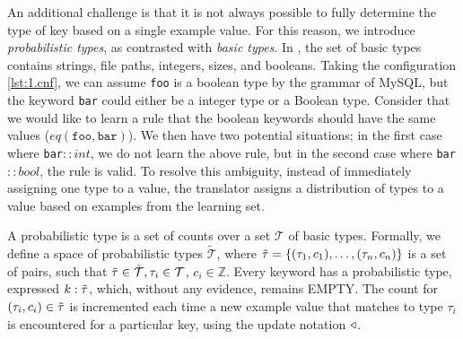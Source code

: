 An additional challenge is that it is not always possible to fully determine the type of key based on a single example value. 
For this reason, we introduce \textit{probabilistic types}, as contrasted with \textit{basic types}.
In \app, the set of basic types contains strings, file paths, integers, sizes, and booleans. 
Taking the configuration \ref{lst:1.cnf}, we can assume {\tt foo} is a boolean type by the grammar of MySQL,
  but the keyword {\tt bar} could either be a integer type or a Boolean type.
Consider that we would like to learn a rule that the boolean keywords should have the same values ($eq(\texttt{foo},\texttt{bar})$).
We then have two potential situations; in the first case where {\tt bar}$::int$, we do not learn the above rule, but in the second case where {\tt bar}$::bool$, the rule is valid.
To resolve this ambiguity, instead of immediately assigning one type to a value, the translator assigns a distribution of types to a value based on examples from the learning set.

A probabilistic type is a set of counts over a set $\mathcal{T}$ of basic types.
Formally, we define a space of probabilistic types $\tilde{\mathcal{T}}$, where $\tilde{\tau}=\{(\tau_1, c_1),\ldots,(\tau_n, c_n)\}$ is a set of pairs, such that $\tilde{\tau} \in \tilde{\mathcal{T}}, \tau_i \in \mathcal{T}$, $c_i \in \mathbb{Z}$. 
Every keyword has a probabilistic type, expressed $k:\tilde{\tau}$, which, without any evidence, remains {\scriptsize EMPTY}.
The count for $(\tau_i,c_i) \in \tilde{\tau}$ is incremented each time a new example value that matches to type $\tau_i$ is encountered for a particular key, using the update notation $\triangleleft$.



